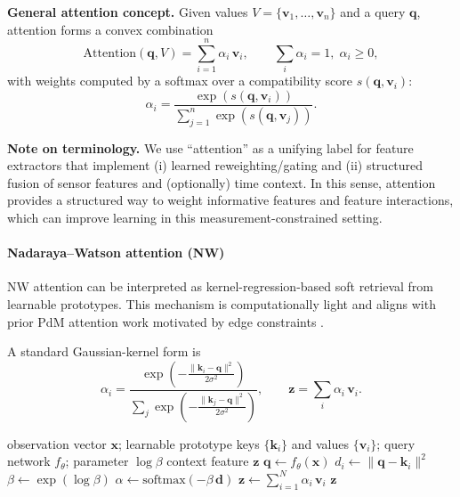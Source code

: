 \documentclass[sn-basic]{sn-jnl} %
\begin{document}
\textbf{General attention concept.}
Given values $V=\{\mathbf{v}_1,\ldots,\mathbf{v}_n\}$ and a query $\mathbf{q}$, attention forms a convex combination
\begin{equation}
\mathrm{Attention}(\mathbf{q},V)=\sum_{i=1}^{n}\alpha_i\,\mathbf{v}_i,\qquad \sum_i\alpha_i=1,\;\alpha_i\ge 0,
\end{equation}
with weights computed by a softmax over a compatibility score $s(\mathbf{q},\mathbf{v}_i)$:
\begin{equation}
\alpha_i = \frac{\exp(s(\mathbf{q},\mathbf{v}_i))}{\sum_{j=1}^n\exp(s(\mathbf{q},\mathbf{v}_j))}.
\end{equation}

\textbf{Note on terminology.}
We use ``attention'' as a unifying label for feature extractors that implement (i) learned reweighting/gating and (ii) structured fusion of sensor features and (optionally) time context. In this sense, attention provides a structured way to weight informative features and feature interactions, which can improve learning in this measurement-constrained setting.

\paragraph{Nadaraya--Watson attention (NW)}
NW attention can be interpreted as kernel-regression-based soft retrieval from learnable prototypes. This mechanism is computationally light and aligns with prior PdM attention work motivated by edge constraints \cite{Siraskar2024}.

A standard Gaussian-kernel form is
\begin{equation}
\alpha_i = \frac{\exp\left(-\tfrac{\lVert \mathbf{k}_i-\mathbf{q}\rVert^2}{2\sigma^2}\right)}{\sum_j \exp\left(-\tfrac{\lVert \mathbf{k}_j-\mathbf{q}\rVert^2}{2\sigma^2}\right)},
\qquad \mathbf{z}=\sum_i\alpha_i\,\mathbf{v}_i.
\end{equation}

\begin{algorithm}[t]
\caption{NW attention feature extractor (forward pass)}
\label{alg:nw_forward}
\begin{algorithmic}[1]
\Require observation vector $\mathbf{x}$; learnable prototype keys $\{\mathbf{k}_i\}$ and values $\{\mathbf{v}_i\}$; query network $f_\theta$; parameter $\log\beta$
\Ensure context feature $\mathbf{z}$
\State $\mathbf{q} \gets f_\theta(\mathbf{x})$ 
        \State $d_i \gets \lVert \mathbf{q}-\mathbf{k}_i\rVert^2$
\EndFor
\State $\beta \gets \exp(\log\beta)$ 
\State $\alpha \gets \mathrm{softmax}(-\beta\,\mathbf{d})$ 
\State $\mathbf{z} \gets \sum_{i=1}^{N} \alpha_i\,\mathbf{v}_i$
\State \Return $\mathbf{z}$
\end{algorithmic}
\end{algorithm}
\end{document}
